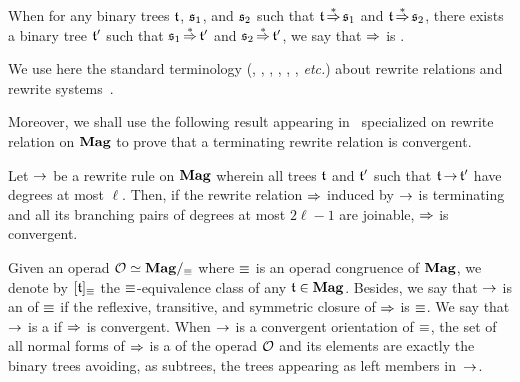 When for any binary trees $\mathfrak{t}$, $\mathfrak{s}_1$, and $\mathfrak{s}_2$ such that
$\mathfrak{t} \operatorname{\overset{\ast}{\operatorname{\Rightarrow}}} \mathfrak{s}_1$ and $\mathfrak{t} \operatorname{\overset{\ast}{\operatorname{\Rightarrow}}} \mathfrak{s}_2$,
there exists a binary tree $\mathfrak{t}'$ such that
$\mathfrak{s}_1 \operatorname{\overset{\ast}{\operatorname{\Rightarrow}}} \mathfrak{t}'$ and $\mathfrak{s}_2 \operatorname{\overset{\ast}{\operatorname{\Rightarrow}}} \mathfrak{t}'$,
we say that $\operatorname{\Rightarrow}$ is .

We use here the standard terminology
(, , , , , , {\em etc.}) about rewrite
relations and rewrite systems~\cite{BN98}.
\medbreak







Moreover, we shall use the following result appearing in~\cite{Gir16}
specialized on rewrite relation on $\mathbf{Mag}$ to prove that a terminating
rewrite relation is convergent.
\medbreak

\begin{Lemma} \label{lem:degree_confluence}
    Let $\operatorname{\to}$ be a rewrite rule on $\mathbf{Mag}$ wherein all trees $\mathfrak{t}$ and
    $\mathfrak{t}'$ such that $\mathfrak{t} \operatorname{\to} \mathfrak{t}'$ have degrees at most $\ell$.
    Then, if the rewrite relation $\operatorname{\Rightarrow}$ induced by $\operatorname{\to}$ is
    terminating and all its branching pairs of degrees at most
    $2\ell - 1$ are joinable, $\operatorname{\Rightarrow}$ is convergent.
\end{Lemma}
\medbreak



Given an operad $\mathcal{O} \simeq \mathbf{Mag}/_{\operatorname{\equiv}}$ where $\operatorname{\equiv}$ is an operad
congruence of $\mathbf{Mag}$, we denote by $[\mathfrak{t}]_{\operatorname{\equiv}}$ the
$\operatorname{\equiv}$-equivalence class of any $\mathfrak{t} \in \mathbf{Mag}$. Besides, we say that
$\operatorname{\to}$ is an  of $\operatorname{\equiv}$ if the reflexive, transitive,
and symmetric closure of $\operatorname{\Rightarrow}$ is $\operatorname{\equiv}$. We say that $\operatorname{\to}$
is a  if $\operatorname{\Rightarrow}$ is convergent. When
$\operatorname{\to}$ is a convergent orientation of $\operatorname{\equiv}$, the set of all normal
forms of $\operatorname{\Rightarrow}$ is a  of the
operad $\mathcal{O}$ and its elements are exactly the binary trees avoiding,
as subtrees, the trees appearing as left members in~$\operatorname{\to}$.
\medbreak
